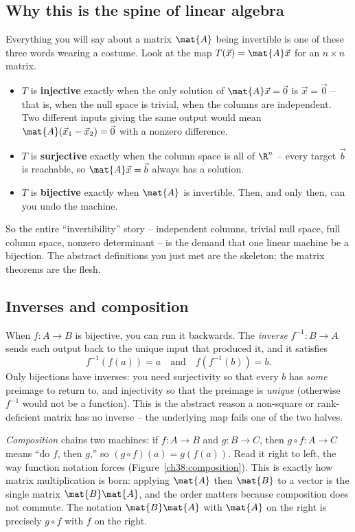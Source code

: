 \subsection{Why this is the spine of linear algebra}

Everything you will say about a matrix $\mat{A}$ being invertible is one of these three
words wearing a costume. Look at the map $T(\vec{x}) = \mat{A}\vec{x}$ for an $n\times n$
matrix.

\begin{itemize}
  \item $T$ is \textbf{injective} exactly when the only solution of $\mat{A}\vec{x} =
        \vec{0}$ is $\vec{x} = \vec{0}$ -- that is, when the null space is trivial, when
        the columns are independent. Two different inputs giving the same output would
        mean $\mat{A}(\vec{x}_1 - \vec{x}_2) = \vec{0}$ with a nonzero difference.
  \item $T$ is \textbf{surjective} exactly when the column space is all of $\R^n$ -- every
        target $\vec{b}$ is reachable, so $\mat{A}\vec{x} = \vec{b}$ always has a solution.
  \item $T$ is \textbf{bijective} exactly when $\mat{A}$ is invertible. Then, and only
        then, can you undo the machine.
\end{itemize}

So the entire ``invertibility'' story -- independent columns, trivial null space, full
column space, nonzero determinant -- is the demand that one linear machine be a bijection.
The abstract definitions you just met are the skeleton; the matrix theorems are the flesh.

\subsection{Inverses and composition}

When $f:A\to B$ is bijective, you can run it backwards. The \emph{inverse} $f^{-1}:B\to A$
sends each output back to the unique input that produced it, and it satisfies
\[
  f^{-1}(f(a)) = a \quad\text{and}\quad f(f^{-1}(b)) = b.
\]
Only bijections have inverses: you need surjectivity so that every $b$ has \emph{some}
preimage to return to, and injectivity so that the preimage is \emph{unique} (otherwise
$f^{-1}$ would not be a function). This is the abstract reason a non-square or
rank-deficient matrix has no inverse -- the underlying map fails one of the two halves.

\emph{Composition} chains two machines: if $f:A\to B$ and $g:B\to C$, then $g \circ f :
A \to C$ means ``do $f$, then $g$,'' so $(g\circ f)(a) = g(f(a))$. Read it right to left,
the way function notation forces (Figure~\ref{ch38:composition}). This is exactly how
matrix multiplication is born: applying $\mat{A}$ then $\mat{B}$ to a vector is the single
matrix $\mat{B}\mat{A}$, and the order matters because composition does not commute. The
notation $\mat{B}\mat{A}$ with $\mat{A}$ on the right is precisely $g\circ f$ with $f$ on
the right.

